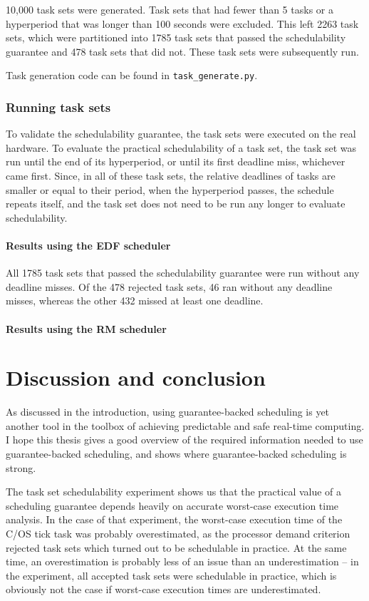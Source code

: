 \documentclass[twoside]{uva-inf-bachelor-thesis}
\newcommand{\code}[1]{\lstinline[breaklines=true]{#1}}
\newcommand{\ucos}{\textmu C/OS\xspace}
\begin{document}
10,000 task sets were generated. Task sets that had fewer than 5 tasks or a hyperperiod that was longer than 100 seconds were excluded. This left 2263 task sets, which were partitioned into 1785 task sets that passed the schedulability guarantee and 478 task sets that did not. These task sets were subsequently run.

Task generation code can be found in \code{task_generate.py}.

\subsection{Running task sets}
To validate the schedulability guarantee, the task sets were executed on the real hardware. To evaluate the practical schedulability of a task set, the task set was run until the end of its hyperperiod, or until its first deadline miss, whichever came first. Since, in all of these task sets, the relative deadlines of tasks are smaller or equal to their period, when the hyperperiod passes, the schedule repeats itself, and the task set does not need to be run any longer to evaluate schedulability.

\subsubsection{Results using the EDF scheduler}
All 1785 task sets that passed the schedulability guarantee were run without any deadline misses. Of the 478 rejected task sets, 46 ran without any deadline misses, whereas the other 432 missed at least one deadline.

\subsubsection{Results using the RM scheduler}

\chapter{Discussion and conclusion}
As discussed in the introduction, using guarantee-backed scheduling is yet another tool in the toolbox of achieving predictable and safe real-time computing. I hope this thesis gives a good overview of the required information needed to use guarantee-backed scheduling, and shows where guarantee-backed scheduling is strong.

The task set schedulability experiment shows us that the practical value of a scheduling guarantee depends heavily on accurate worst-case execution time analysis. In the case of that experiment, the worst-case execution time of the \ucos tick task was probably overestimated, as the processor demand criterion rejected task sets which turned out to be schedulable in practice. At the same time, an overestimation is probably less of an issue than an underestimation -- in the experiment, all accepted task sets were schedulable in practice, which is obviously not the case if worst-case execution times are underestimated.
\end{document}

